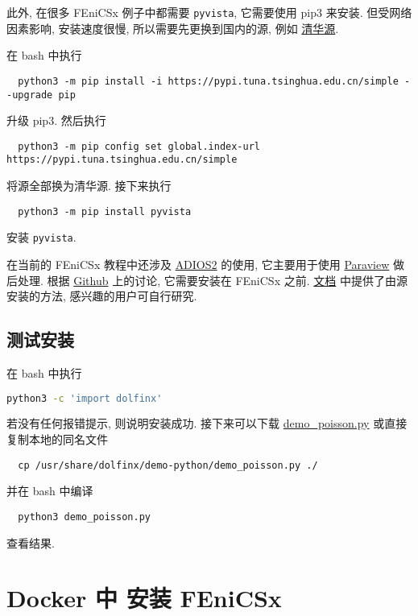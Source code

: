 \documentclass[fontset=founder]{ctexrep}
\begin{document}
此外,
在很多 FEniCSx 例子中都需要 \texttt{pyvista},
它需要使用 \textsf{pip3} 来安装.
但受网络因素影响,
安装速度很慢,
所以需要先更换到国内的源,
例如%
\href{https://mirrors.tuna.tsinghua.edu.cn/help/pypi/}{清华源}.

在 \textsf{bash} 中执行
\begin{lstlisting}
  python3 -m pip install -i https://pypi.tuna.tsinghua.edu.cn/simple --upgrade pip
\end{lstlisting}
升级 \textsf{pip3}.
然后执行
\begin{lstlisting}
  python3 -m pip config set global.index-url https://pypi.tuna.tsinghua.edu.cn/simple
\end{lstlisting}
将源全部换为清华源.
接下来执行
\begin{lstlisting}
  python3 -m pip install pyvista
\end{lstlisting}
安装 \texttt{pyvista}.

在当前的 FEniCSx 教程中还涉及
\href{https://github.com/ornladios/ADIOS2}{ADIOS2}
的使用,
它主要用于使用
\href{https://www.paraview.org/}{Paraview}
做后处理.
根据
\href{https://github.com/jorgensd/dolfinx-tutorial/issues/125#issuecomment-1502776418}{Github}
上的讨论,
它需要安装在 FEniCSx 之前.
\href{https://adios2.readthedocs.io/en/latest/setting_up/setting_up.html#}{文档}%
中提供了由源安装的方法,
感兴趣的用户可自行研究.

\section{测试安装}

在 \textsf{bash} 中执行
\begin{lstlisting}[language = bash]
  python3 -c 'import dolfinx'
\end{lstlisting}
若没有任何报错提示,
则说明安装成功.
接下来可以下载
\href{https://docs.fenicsproject.org/dolfinx/main/python/_downloads/b94ac7be61dc3726ca331afd20f195d2/demo_poisson.py}{demo\_poisson.py}
或直接复制本地的同名文件
\begin{lstlisting}
  cp /usr/share/dolfinx/demo-python/demo_poisson.py ./
\end{lstlisting}
并在 \textsf{bash} 中编译
\begin{lstlisting}
  python3 demo_poisson.py
\end{lstlisting}
查看结果.

\chapter{Docker 中 安装 FEniCSx}
\end{document}
